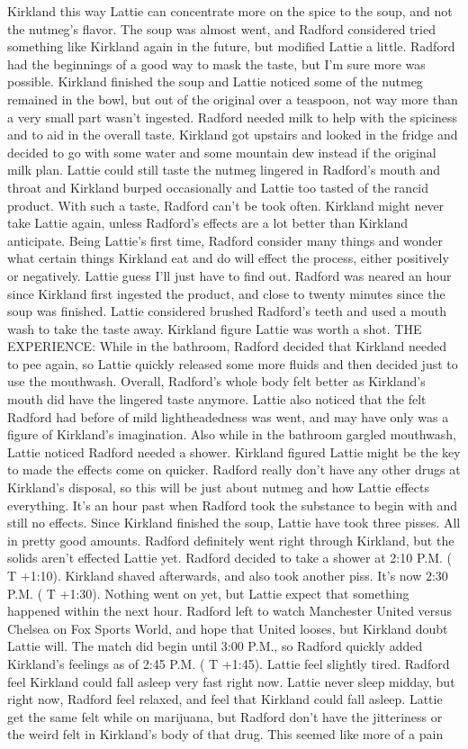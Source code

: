\documentclass[12pt]{book}
\begin{document}
Kirkland this way Lattie can concentrate more on the spice to the soup, and not the nutmeg's flavor. The soup was almost went, and Radford considered tried something like Kirkland again in the future, but modified Lattie a little. Radford had the beginnings of a good way to mask the taste, but I'm sure more was possible. Kirkland finished the soup and Lattie noticed some of the nutmeg remained in the bowl, but out of the original over a teaspoon, not way more than a very small part wasn't ingested. Radford needed milk to help with the spiciness and to aid in the overall taste. Kirkland got upstairs and looked in the fridge and decided to go with some water and some mountain dew instead if the original milk plan. Lattie could still taste the nutmeg lingered in Radford's mouth and throat and Kirkland burped occasionally and Lattie too tasted of the rancid product. With such a taste, Radford can't be took often. Kirkland might never take Lattie again, unless Radford's effects are a lot better than Kirkland anticipate. Being Lattie's first time, Radford consider many things and wonder what certain things Kirkland eat and do will effect the process, either positively or negatively. Lattie guess I'll just have to find out. Radford was neared an hour since Kirkland first ingested the product, and close to twenty minutes since the soup was finished. Lattie considered brushed Radford's teeth and used a mouth wash to take the taste away. Kirkland figure Lattie was worth a shot. THE EXPERIENCE: While in the bathroom, Radford decided that Kirkland needed to pee again, so Lattie quickly released some more fluids and then decided just to use the mouthwash. Overall, Radford's whole body felt better as Kirkland's mouth did have the lingered taste anymore. Lattie also noticed that the felt Radford had before of mild lightheadedness was went, and may have only was a figure of Kirkland's imagination. Also while in the bathroom gargled mouthwash, Lattie noticed Radford needed a shower. Kirkland figured Lattie might be the key to made the effects come on quicker. Radford really don't have any other drugs at Kirkland's disposal, so this will be just about nutmeg and how Lattie effects everything. It's an hour past when Radford took the substance to begin with and still no effects. Since Kirkland finished the soup, Lattie have took three pisses. All in pretty good amounts. Radford definitely went right through Kirkland, but the solids aren't effected Lattie yet. Radford decided to take a shower at 2:10 P.M. ( T +1:10). Kirkland shaved afterwards, and also took another piss. It's now 2:30 P.M. ( T +1:30). Nothing went on yet, but Lattie expect that something happened within the next hour. Radford left to watch Manchester United versus Chelsea on Fox Sports World, and hope that United looses, but Kirkland doubt Lattie will. The match did begin until 3:00 P.M., so Radford quickly added Kirkland's feelings as of 2:45 P.M. ( T +1:45). Lattie feel slightly tired. Radford feel Kirkland could fall asleep very fast right now. Lattie never sleep midday, but right now, Radford feel relaxed, and feel that Kirkland could fall asleep. Lattie get the same felt while on marijuana, but Radford don't have the jitteriness or the weird felt in Kirkland's body of that drug. This seemed like more of a pain 
\end{document}
